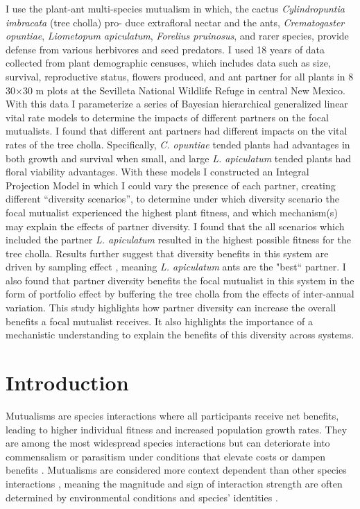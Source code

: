 \documentclass[11pt]{article}
\begin{document}
I use the plant-ant multi-species mutualism in which, the cactus \textit{Cylindropuntia imbracata} (tree cholla) pro- duce extrafloral nectar and the ants, \textit{Crematogaster opuntiae}, \textit{Liometopum apiculatum}, \textit{Forelius pruinosus}, and rarer species, provide defense from various herbivores and seed predators. 
I used 18 years of data collected from plant demographic censuses, which includes data such as size, survival, reproductive status, flowers produced, and ant partner for all plants in 8 30$\times$30 m plots at the Sevilleta National Wildlife Refuge in central New Mexico. 
With this data I parameterize a series of Bayesian hierarchical generalized linear vital rate models to determine the impacts of different partners on the focal mutualists. 
I found that different ant partners had different impacts on the vital rates of the tree cholla. 
Specifically, \textit{C. opuntiae} tended plants had advantages in both growth and survival when small, and large \textit{L. apiculatum} tended plants had floral viability advantages. 
With these models I constructed an Integral Projection Model in which I could vary the presence of each partner, creating different “diversity scenarios”, to determine under which diversity scenario the focal mutualist experienced the highest plant fitness, and which mechanism(s) may explain the effects of partner diversity. 
I found that the all scenarios which included the partner \textit{L. apiculatum} resulted in the highest possible fitness for the tree cholla. 
Results further suggest that diversity benefits in this system are driven by sampling effect , meaning \textit{L. apiculatum} ants are the "best`` partner.
I also found that partner diversity benefits the focal mutualist in this system in the form of portfolio effect by buffering the tree cholla from the effects of inter-annual variation. 
This study highlights how partner diversity can increase the overall benefits a focal mutualist receives. 
It also highlights the importance of a mechanistic understanding to explain the benefits of this diversity across systems.

\newpage{}
\section*{Introduction}
Mutualisms are species interactions where all participants receive net benefits, leading to higher individual fitness and increased population growth rates. 
They are among the most widespread species interactions \citep{Bronstein1994,Chamberlain2014,Frederickson2013,Axelrod1981,Leigh2010} but can deteriorate into commensalism or parasitism under conditions that elevate costs or dampen benefits \citep{Rodriguez-Rodriguez2017,Song2020,Mandyam2014,Thrall2007, Bahia2022}.
Mutualisms are considered more context dependent than other species interactions \citep{Chamberlain2014,Frederickson2013}, meaning the magnitude and sign of interaction strength are often determined by environmental conditions and species' identities \cite{Noe1994,Leigh2010}.
\end{document}
